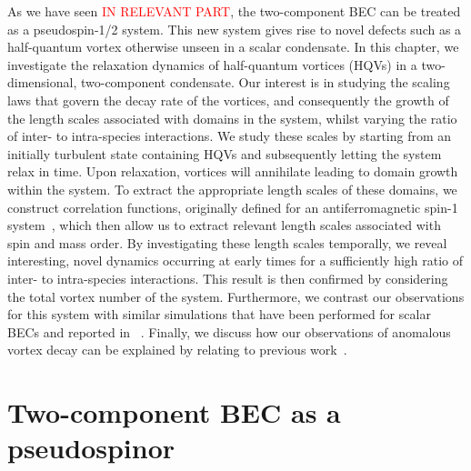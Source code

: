 As we have seen \textcolor{red}{IN RELEVANT PART}, the two-component BEC can be 
treated as a pseudospin-1/2 system. 
This new system gives rise to novel defects such as a half-quantum vortex 
otherwise unseen in a scalar condensate. 
In this chapter, we investigate the relaxation dynamics of half-quantum vortices 
(HQVs) in a two-dimensional, two-component condensate. 
Our interest is in studying the scaling laws that govern the decay rate of the 
vortices, and consequently the growth of the length scales associated with 
domains in the system, whilst varying the ratio of inter- to intra-species 
interactions. 
We study these scales by starting from an initially turbulent state containing
HQVs and subsequently letting the system relax in time.
Upon relaxation, vortices will annihilate leading to domain growth within 
the system.
To extract the appropriate length scales of these domains, we construct 
correlation functions, originally defined for an antiferromagnetic spin-1 
system~\cite{Symes2017}, which then allow us to extract relevant length scales
associated with spin and mass order.
By investigating these length scales temporally, we reveal interesting, 
novel dynamics occurring at early times for a sufficiently high ratio of 
inter- to intra-species interactions. 
This result is then confirmed by considering the total vortex number of the 
system. 
Furthermore, we contrast our observations for this system with similar
simulations that have been performed for scalar BECs and reported
in ~\cite{Schole2012, Nowak2012, Karl2017}.
Finally, we discuss how our observations of anomalous vortex decay can be
explained by relating to previous work~\cite{Eto2011, Kasamatsu2016}.


\section{Two-component BEC as a pseudospinor}
